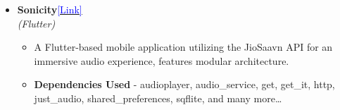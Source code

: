 \documentclass[10pt,a4paper,ragged2e,withhyper]{class}
\begin{document}
\begin{paracol}{2}
    \begin{itemize}
        \item[\raisebox{0.25\height}{\large{\ding{228}}}] {
            {\LARGE{\textbf{Sonicity}}}\hspace{1.5mm}\href{https://github.com/AkshatGupta-30/Sonicity--Flutter}{\textcolor{blue}{[Link]}}\\
            \textit{\large{(Flutter)}}
            \begin{itemize}
                \item[\footnotesize{\ding{109}}] \normalsize{A Flutter-based mobile application utilizing the JioSaavn API for an immersive audio experience, features modular architecture.}
                \item[\footnotesize{\ding{109}}] \normalsize{\textbf{Dependencies Used} \hspace{1.2mm}-\hspace{1.2mm} audioplayer, audio\_service, get, get\_it, http, just\_audio, shared\_preferences, sqflite, and many more…}
            \end{itemize}
        }
    \end{itemize}
\end{paracol}
\end{document}
